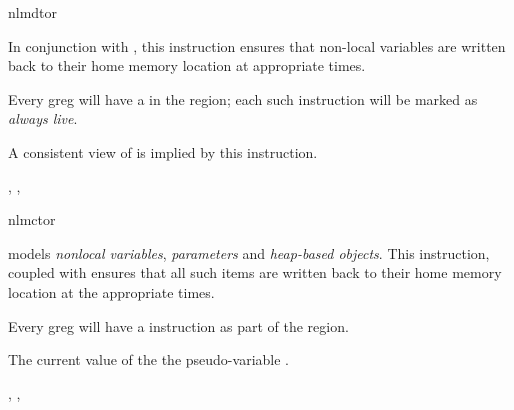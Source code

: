 \begin{instruction}{nlmdtor}

  \begin{notes}

    In conjunction with , this
    instruction ensures that non-local variables are written back to
    their home memory location at appropriate times.

    Every \ac{greg} will have a  in the
     region; each such instruction will be marked as
    \emph{always live}.

  \end{notes}

  \begin{results}
  \item A consistent view of  is implied by this
    instruction.
  \end{results}

  \noperands

  \begin{seealso}
    , ,
  \end{seealso}
\end{instruction}

\begin{instruction}{nlmctor}

  \begin{notes}
     models \emph{nonlocal variables}, \emph{\byref
      parameters} and \emph{heap-based objects}.  This instruction,
    coupled with  ensures that all
    such items are written back to their home memory location at the
    appropriate times.

    Every \ac{greg} will have a  instruction as
    part of the  region.
  \end{notes}

  \begin{results}
  \item The current value of the the pseudo-variable
    .
  \end{results}

  \noperands

  \begin{seealso}
    , ,
  \end{seealso}
\end{instruction}

